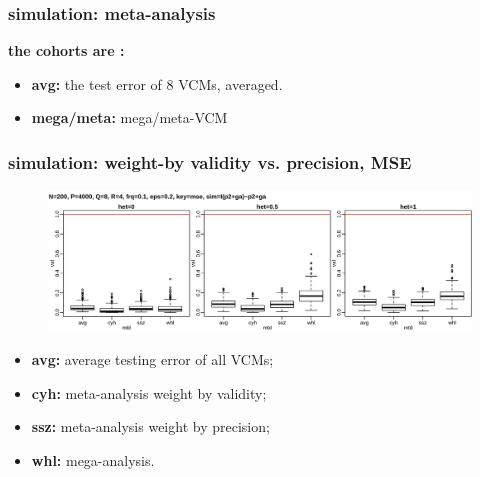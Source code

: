 \documentclass{beamer}
\begin{document}
\begin{frame}%
  \frametitle{simulation: meta-analysis} %
  \textbf{the cohorts are \color{red}{heterogeneous}:} \\
  \textbf{\color{blue}{inner plot: strategies, from left to right:}}
  \begin{itemize}
  \item \textbf{avg:} the test error of 8 VCMs, averaged.
  \item \textbf{mega/meta:} mega/meta-VCM
  \end{itemize}
\end{frame}
\begin{frame}%
  \frametitle{simulation: weight-by validity vs. precision, MSE} %
  \begin{figure}
    \centering \includegraphics[width=1.0\linewidth]{img/met_mnq_cyh_mse}
  \end{figure}
  \textbf{\color{blue}{inner plot: strategies, from left to right:}}
  \begin{itemize}
  \item \textbf{avg:} average testing error of all VCMs;
  \item \textbf{cyh:} meta-analysis weight by validity;
  \item \textbf{ssz:} meta-analysis weight by precision;
  \item \textbf{whl:} mega-analysis.
  \end{itemize}
\end{frame}
\end{document}
